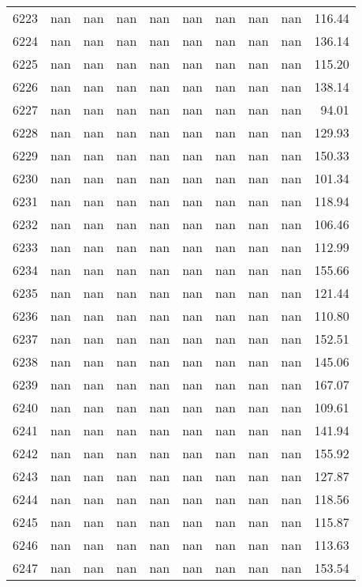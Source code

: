 \begin{tabular}{lrrrrrrrrr}
6223 & nan & nan & nan & nan & nan & nan & nan & nan & 116.44 \\
6224 & nan & nan & nan & nan & nan & nan & nan & nan & 136.14 \\
6225 & nan & nan & nan & nan & nan & nan & nan & nan & 115.20 \\
6226 & nan & nan & nan & nan & nan & nan & nan & nan & 138.14 \\
6227 & nan & nan & nan & nan & nan & nan & nan & nan & 94.01 \\
6228 & nan & nan & nan & nan & nan & nan & nan & nan & 129.93 \\
6229 & nan & nan & nan & nan & nan & nan & nan & nan & 150.33 \\
6230 & nan & nan & nan & nan & nan & nan & nan & nan & 101.34 \\
6231 & nan & nan & nan & nan & nan & nan & nan & nan & 118.94 \\
6232 & nan & nan & nan & nan & nan & nan & nan & nan & 106.46 \\
6233 & nan & nan & nan & nan & nan & nan & nan & nan & 112.99 \\
6234 & nan & nan & nan & nan & nan & nan & nan & nan & 155.66 \\
6235 & nan & nan & nan & nan & nan & nan & nan & nan & 121.44 \\
6236 & nan & nan & nan & nan & nan & nan & nan & nan & 110.80 \\
6237 & nan & nan & nan & nan & nan & nan & nan & nan & 152.51 \\
6238 & nan & nan & nan & nan & nan & nan & nan & nan & 145.06 \\
6239 & nan & nan & nan & nan & nan & nan & nan & nan & 167.07 \\
6240 & nan & nan & nan & nan & nan & nan & nan & nan & 109.61 \\
6241 & nan & nan & nan & nan & nan & nan & nan & nan & 141.94 \\
6242 & nan & nan & nan & nan & nan & nan & nan & nan & 155.92 \\
6243 & nan & nan & nan & nan & nan & nan & nan & nan & 127.87 \\
6244 & nan & nan & nan & nan & nan & nan & nan & nan & 118.56 \\
6245 & nan & nan & nan & nan & nan & nan & nan & nan & 115.87 \\
6246 & nan & nan & nan & nan & nan & nan & nan & nan & 113.63 \\
6247 & nan & nan & nan & nan & nan & nan & nan & nan & 153.54 \\

\end{tabular}
